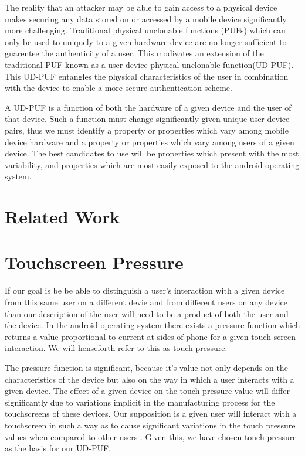 \documentclass{acm_proc_article-sp}
\begin{document}
The reality that an attacker may be able to gain access to a physical device makes securing any data stored on or accessed by a mobile device significantly more challenging. Traditional physical unclonable functions (PUFs) which can only be used to uniquely to a given hardware device are no longer sufficient to guarentee the authenticity of a user.
%
This modivates an extension of the traditional PUF known as a user-device physical unclonable function(UD-PUF). This UD-PUF entangles the physical characteristics of the user in combination with the device to enable a more secure authentication scheme.

A UD-PUF is a function of both the hardware of a given device and the user of that device. Such a function must change significantly given unique user-device pairs, thus we must identify a property or properties which vary among mobile device hardware and a property or properties which vary among users of a given device. The best candidates to use will be properties which present with the most variability, and properties which are most easily exposed to the android operating system.

\section{Related Work}
\label{sec:related_work}


\section{Touchscreen Pressure}
\label{sec:touchscreen}
If our goal is be be able to distinguish a user's interaction with a given device from this same user on a different devie and from different users on any device than our description of the user will need to be a product of both the user and the device. In the android operating system there exists a pressure function which returns a value proportional to current at sides of phone for a given touch screen interaction. \cite{zhu2013sensec} We will henseforth refer to this as touch pressure. 

The pressure function is significant, because it's value not only depends on the characteristics of the device but also on the way in which a user interacts with a given device. The effect of a given device on the touch pressure value will differ significantly due to variations implicit in the manufacturing process for the touchscreens of these devices. \cite{manufacturing_differences} Our supposition is a given user will interact with a touchscreen in such a way as to cause significant variations in the touch pressure values when compared to other users \cite{user_touchscreen_interations}.  Given this, we have chosen touch pressure as the basis for our UD-PUF.
\end{document}

